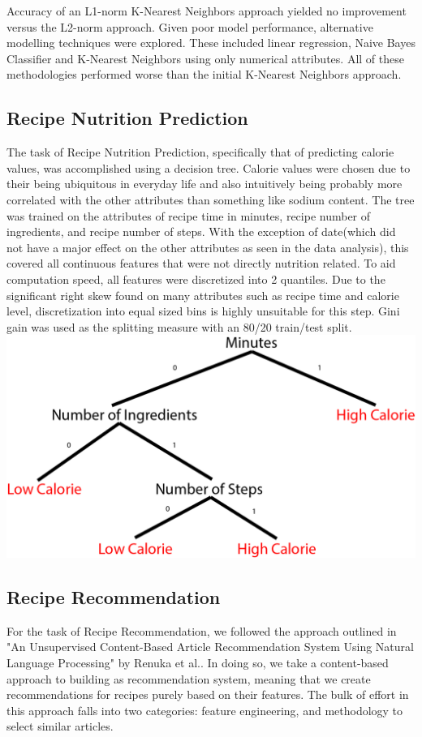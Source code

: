 \documentclass[sigconf]{acmart}
\begin{document}
Accuracy of an L1-norm K-Nearest Neighbors approach yielded no improvement versus the L2-norm approach. Given poor model performance, alternative modelling techniques were explored. These included linear regression, Naive Bayes Classifier and K-Nearest Neighbors using only numerical attributes. All of these methodologies performed worse than the initial K-Nearest Neighbors approach. 


\subsection{Recipe Nutrition Prediction}
The task of Recipe Nutrition Prediction, specifically that of predicting calorie values, was accomplished using a decision tree. Calorie values were chosen due to their being ubiquitous in everyday life and also intuitively being probably more correlated with the other attributes than something like sodium content. The tree was trained on the attributes of recipe time in minutes, recipe number of ingredients, and recipe number of steps. With the exception of date(which did not have a major effect on the other attributes as seen in the data analysis), this covered all continuous features that were not directly nutrition related. To aid computation speed, all features were discretized into 2 quantiles. Due to the significant right skew found on many attributes such as recipe time and calorie level, discretization into equal sized bins is highly unsuitable for this step. Gini gain was used as the splitting measure with an 80/20 train/test split.
\includegraphics[width=\linewidth]{decisiontree.png}


\subsection{Recipe Recommendation}
For the task of Recipe Recommendation, we followed the approach outlined in "An Unsupervised Content-Based Article Recommendation System Using Natural Language Processing" by Renuka et al.\cite{RSArticle}. In doing so, we take a content-based approach to building as recommendation system, meaning that we create recommendations for recipes purely based on their features. The bulk of effort in this approach falls into two categories: feature engineering, and methodology to select similar articles.
\end{document}
